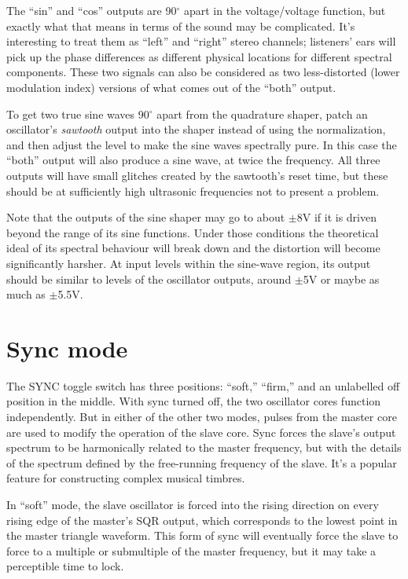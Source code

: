 The ``sin'' and ``cos'' outputs are 90$^\circ$ apart in the voltage/voltage
function, but exactly what that means in terms of the sound may be
complicated.  It's interesting to treat them as ``left'' and ``right''
stereo channels; listeners' ears will pick up the phase differences as
different physical locations for different spectral components.  These two
signals can also be considered as two less-distorted (lower modulation
index) versions of what comes out of the ``both'' output.

To get two true sine waves 90$^\circ$ apart from the quadrature shaper,
patch an oscillator's \emph{sawtooth} output into the shaper instead of
using the normalization, and then adjust the level to make the sine waves
spectrally pure.  In this case the ``both'' output will also produce a sine
wave, at twice the frequency.  All three outputs will have small glitches
created by the sawtooth's reset time, but these should be at sufficiently
high ultrasonic frequencies not to present a problem.

Note that the outputs of the sine shaper may go to about $\pm$8V if it is
driven beyond the range of its sine functions.  Under those conditions the
theoretical ideal of its spectral behaviour will break down and the
distortion will become significantly harsher.  At input levels within the
sine-wave region, its output should be similar to levels of the oscillator
outputs, around $\pm$5V or maybe as much as $\pm$5.5V.

\section{Sync mode}

The SYNC toggle switch has three positions:  ``soft,'' ``firm,'' and an
unlabelled off position in the middle.  With sync turned off, the two
oscillator cores function independently.  But in either of the other two
modes, pulses from the master core are used to modify the operation of the
slave core.  Sync forces the slave's output spectrum to be harmonically
related to the master frequency, but with the details of the spectrum
defined by the free-running frequency of the slave.  It's a popular feature
for constructing complex musical timbres.

In ``soft'' mode, the slave oscillator is forced into the rising direction
on every rising edge of the master's SQR output, which corresponds to the
lowest point in the master triangle waveform.  This form of sync will
eventually force the slave to force to a multiple or submultiple of the
master frequency, but it may take a perceptible time to lock.

